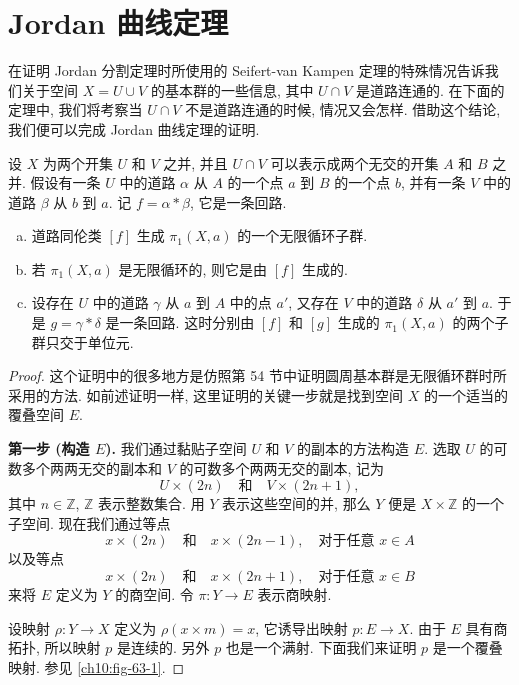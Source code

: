 \section{Jordan 曲线定理}\label{ch10:section-jordan-curve}

在证明 Jordan 分割定理时所使用的 Seifert-van Kampen 定理的特殊情况告诉我们关于空间 $X=U\cup V$ 的基本群的一些信息, 其中 $U\cap V$ 是道路连通的. 在下面的定理中, 我们将考察当 $U\cap V$ 不是道路连通的时候, 情况又会怎样. 借助这个结论, 我们便可以完成 Jordan 曲线定理的证明.

\begin{theorem}\label{ch10:thm-two-open-sets-fund-group}
设 $X$ 为两个开集 $U$ 和 $V$ 之并, 并且 $U\cap V$ 可以表示成两个无交的开集 $A$ 和 $B$ 之并. 假设有一条 $U$ 中的道路 $\alpha$ 从 $A$ 的一个点 $a$ 到 $B$ 的一个点 $b$, 并有一条 $V$ 中的道路 $\beta$ 从 $b$ 到 $a$. 记 $f=\alpha*\beta$, 它是一条回路.

\begin{enumerate}[(a)]
\item 道路同伦类 $[f]$ 生成 $\pi_{1}(X,a)$ 的一个无限循环子群.
\item 若 $\pi_{1}(X,a)$ 是无限循环的, 则它是由 $[f]$ 生成的.
\item 设存在 $U$ 中的道路 $\gamma$ 从 $a$ 到 $A$ 中的点 $a'$, 又存在 $V$ 中的道路 $\delta$ 从 $a'$ 到 $a$. 于是 $g=\gamma*\delta$ 是一条回路. 这时分别由 $[f]$ 和 $[g]$ 生成的 $\pi_{1}(X,a)$ 的两个子群只交于单位元.
\end{enumerate}
\end{theorem}

\begin{proof}
这个证明中的很多地方是仿照第 54 节中证明圆周基本群是无限循环群时所采用的方法. 如前述证明一样, 这里证明的关键一步就是找到空间 $X$ 的一个适当的覆叠空间 $E$.

\textbf{第一步 (构造 $E$).} 我们通过黏贴子空间 $U$ 和 $V$ 的副本的方法构造 $E$. 选取 $U$ 的可数多个两两无交的副本和 $V$ 的可数多个两两无交的副本, 记为
\[
U\times(2n)\quad\text{和}\quad V\times(2n+1),
\]
其中 $n\in\mathbb{Z}$, $\mathbb{Z}$ 表示整数集合. 用 $Y$ 表示这些空间的并, 那么 $Y$ 便是 $X\times\mathbb{Z}$ 的一个子空间. 现在我们通过等点
\[
x\times(2n)\quad\text{和}\quad x\times(2n-1),\quad\text{对于任意 }x\in A
\]
以及等点
\[
x\times(2n)\quad\text{和}\quad x\times(2n+1),\quad\text{对于任意 }x\in B
\]
来将 $E$ 定义为 $Y$ 的商空间. 令 $\pi\colon Y\to E$ 表示商映射.

设映射 $\rho\colon Y\to X$ 定义为 $\rho(x\times m)=x$, 它诱导出映射 $p\colon E\to X$. 由于 $E$ 具有商拓扑, 所以映射 $p$ 是连续的. 另外 $p$ 也是一个满射. 下面我们来证明 $p$ 是一个覆叠映射. 参见 \cref{ch10:fig-63-1}.
\end{proof}

